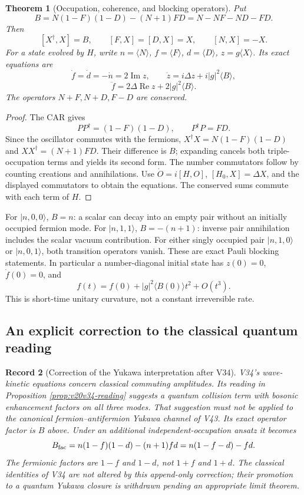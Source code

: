 \documentclass[11pt]{article}
\newtheorem{theorem}{Theorem}[section]
\newtheorem{record}[theorem]{Record}
\theoremstyle{remark}
\begin{document}
\begin{theorem}[Occupation, coherence, and blocking operators]
\label{thm:v20v44-algebra}
Put
\[
 B=N(1-F)(1-D)-(N+1)FD=N-NF-ND-FD.
\]
Then
\[
 [X^\dagger,X]=B,\qquad
 [F,X]=[D,X]=X,\qquad [N,X]=-X.
\]
For a state evolved by \(H\), write
\(n=\langle N\rangle\), \(f=\langle F\rangle\),
\(d=\langle D\rangle\), \(z=g\langle X\rangle\).
Its exact equations are
\[
 \dot f=\dot d=-\dot n=2\operatorname{Im}z,\qquad
 \dot z=i\Delta z+i|g|^2\langle B\rangle,
\]
\[
 \ddot f=2\Delta\operatorname{Re}z+2|g|^2\langle B\rangle.
\]
The operators \(N+F,N+D,F-D\) are conserved.
\end{theorem}
\begin{proof}
The CAR gives
\[
 PP^\dagger=(1-F)(1-D),\qquad P^\dagger P=FD.
\]
Since the oscillator commutes with the fermions,
\(X^\dagger X=N(1-F)(1-D)\) and
\(XX^\dagger=(N+1)FD\).  Their difference is \(B\); expanding
cancels both triple-occupation terms and yields its second form.
The number commutators follow by counting creations and annihilations.
Use \(\dot O=i[H,O]\), \([H_0,X]=\Delta X\), and the displayed
commutators to obtain the equations.  The conserved sums commute
with each term of \(H\).
\end{proof}

For \(|n,0,0\rangle\), \(B=n\): a scalar can decay into an empty
pair without an initially occupied fermion mode.  For
\(|n,1,1\rangle\), \(B=-(n+1)\): inverse pair annihilation includes
the scalar vacuum contribution.  For either singly occupied pair
\(|n,1,0\rangle\) or \(|n,0,1\rangle\), both transition operators
vanish.  These are exact Pauli blocking statements.
In particular a number-diagonal initial state has \(z(0)=0\),
\(\dot f(0)=0\), and
\[
 f(t)=f(0)+|g|^2\langle B(0)\rangle t^2+O(t^3).
\]
This is short-time unitary curvature, not a constant irreversible rate.

\subsection{An explicit correction to the classical quantum reading}

\begin{record}[Correction of the Yukawa interpretation after V34]
\label{rec:v20v44-correction}
V34's wave-kinetic equations concern classical commuting amplitudes.
Its reading in Proposition \ref{prop:v20v34-reading} suggests a
quantum collision term with bosonic enhancement factors on all
three modes.  That suggestion must not be applied to the canonical
fermion--antifermion Yukawa channel of V43.  Its exact operator
factor is \(B\) above.  Under an additional independent-occupation
ansatz it becomes
\[
 B_{\rm fac}=n(1-f)(1-d)-(n+1)fd
            =n(1-f-d)-fd.
\]
The fermionic factors are \(1-f\) and \(1-d\), not \(1+f\) and
\(1+d\).  The classical identities of V34 are not altered by this
append-only correction; their promotion to a quantum Yukawa closure
is withdrawn pending an appropriate limit theorem.
\end{record}
\end{document}
